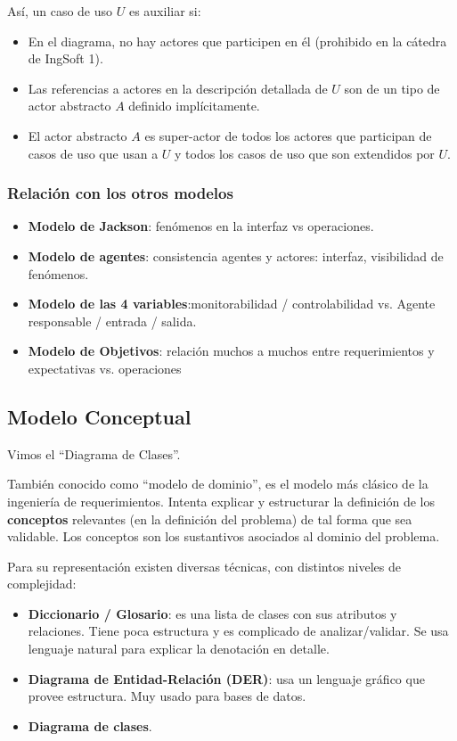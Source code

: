\documentclass[]{article}
\begin{document}
Así, un caso de uso $U$ es auxiliar si:
\begin{itemize}
	\item En el diagrama, no hay actores que participen en él (prohibido en la cátedra de IngSoft 1).
	\item Las referencias a actores en la descripción detallada de $U$ son de un tipo de actor abstracto $A$ definido implícitamente.
	\item El actor abstracto $A$ es super-actor de todos los actores que participan de casos de uso que usan a $U$ y todos los casos de uso que son extendidos por $U$.
\end{itemize}

\subsubsection{Relación con los otros modelos}
\begin{itemize}
	\item \textbf{Modelo de Jackson}: fenómenos en la interfaz vs operaciones.
	\item \textbf{Modelo de agentes}: consistencia agentes y actores: interfaz, visibilidad de fenómenos.
	\item \textbf{Modelo de las 4 variables}:monitorabilidad / controlabilidad vs. Agente responsable / entrada / salida.
	\item \textbf{Modelo de Objetivos}: relación muchos a muchos entre requerimientos y expectativas vs. operaciones
\end{itemize}

\subsection{Modelo Conceptual}
Vimos el ``Diagrama de Clases''.

También conocido como ``modelo de dominio'', es el modelo más clásico de la ingeniería de requerimientos. Intenta explicar y estructurar la definición de los \textbf{conceptos} relevantes (en la definición del problema) de tal forma que sea validable. Los conceptos son los sustantivos asociados al dominio del problema.

Para su representación existen diversas técnicas, con distintos niveles de complejidad:
\begin{itemize}
	\item \textbf{Diccionario / Glosario}: es una lista de clases con sus atributos y relaciones. Tiene poca estructura y es complicado de analizar/validar. Se usa lenguaje natural para explicar la denotación en detalle.
	\item \textbf{Diagrama de Entidad-Relación (DER)}: usa un lenguaje gráfico que provee estructura. Muy usado para bases de datos.
	\item \textbf{Diagrama de clases}.
\end{itemize}
\end{document}
